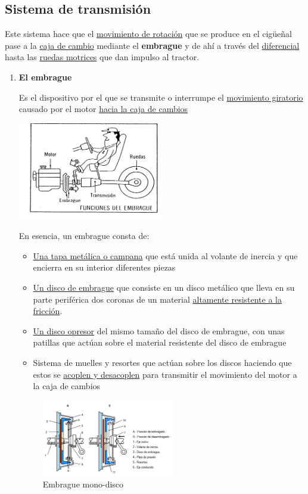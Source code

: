 \documentclass[a4paper,12pt,oneside]{book}
\begin{document}
\subsection{Sistema de transmisión}
\label{sec:org4c7e890}
Este sistema hace que el \uline{movimiento de rotación} que se produce en el cigüeñal
pase a la \uline{caja de cambio} mediante el \textbf{embrague} y de ahí a través del
\uline{diferencial} hasta las \uline{ruedas motrices} que dan impulso al tractor.
\begin{enumerate}
\item \textbf{El embrague}
\label{sec:org2d88a4f}

Es el dispositivo por el que se transmite o interrumpe el \uline{movimiento
giratorio} causado por el motor \uline{hacia la caja de cambios}
\begin{center}
\includegraphics[width=0.5\textwidth]{./img_0009/embrague_1.png}
\end{center}
En esencia, un embrague consta de:
\begin{itemize}
\item \uline{Una tapa metálica o campana} que está unida al volante de inercia y que
encierra en su interior diferentes piezas
\item \uline{Un disco de embrague} que consiste en un disco metálico que lleva en su
parte periférica dos coronas de un material \uline{altamente resistente a la fricción}.
\item \uline{Un disco opresor} del mismo tamaño del disco de embrague, con unas patillas
que actúan sobre el material resistente del disco de embrague
\item Sistema de muelles y resortes que actúan sobre los discos haciendo que estos se
\uline{acoplen y desacoplen} para transmitir el movimiento del motor a la caja de
cambios
\end{itemize}

\begin{figure}[htbp]
\centering
\includegraphics[width=0.55\textwidth]{./img_0009/embrague.png}
\caption{Embrague mono-disco}
\end{figure}


\end{enumerate}
\end{document}
